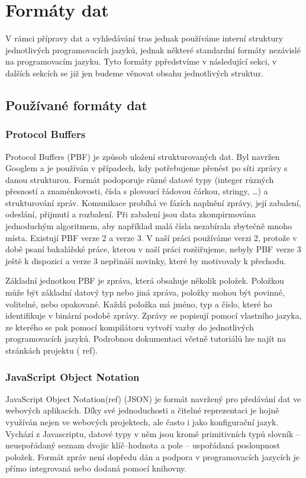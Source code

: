 \chapter{Formáty dat}
V rámci přípravy dat a vyhledávání tras jednak používáme interní struktury
jednotlivých programovacích jazyků, jednak některé standardní formáty nezávislé
na programovacím jazyku. Tyto formáty ppředstvíme v následující sekci, v dalších
sekcích se již jen budeme věnovat obsahu jednotlivých struktur.
\section{Používané formáty dat}
\subsection{Protocol Buffers}
Protocol Buffers (PBF) je způsob uložení strukturovaných dat. Byl navržen
Googlem a je používán v případech, kdy potřebujeme přenést po síti zprávy s
danou strukturou. Formát podoporuje různé datové typy (integer různých přesností
a znaménkovosti, čísla s plovoucí řádovou čárkou, stringy, \dots) a
strukturování zpráv. Komunikace probíhá ve fázích naplnění zprávy, její
zabalení, odeslání, přijmutí a rozbalení. Při zabalení jsou data zkompirmována
jednoduchým algoritmem, aby například malá čísla nezabírala zbytečně mnoho
místa. Existují PBF verze 2 a verze 3. V naší práci používáme verzi 2, protože v
době psaní bakalářské práce, kterou v naší práci rozšiřujeme, nebyly PBF verze 3
ještě k dispozici a verze 3 nepřináší novinky, které by motivovaly k přechodu.

Základní jednotkou PBF je zpráva, která obsahuje několik položek. Položkou může
být základní datový typ nebo jiná zpráva, položky mohou být povinné, volitelné,
nebo opakované. Každá položka má jméno, typ a číslo, které ho identifikuje v
binární podobě zprávy. Zprávy se popisují pomocí vlastního jazyka, ze kterého se
pak pomocí kompilátoru vytvoří vazby do jednotlivých programovacích jazyků. 
Podrobnou dokumentaci včetně tutoriálů lze najít na stránkách projektu (\TODO
ref).

\subsection{JavaScript Object Notation}
JavaScript Object Notation(\TODO ref) (JSON) je formát navržený pro předávání dat ve
webových aplikacích. Díky své jednoduchosti a čitelné reprezentaci je hojně
využíván nejen ve webových projektech, ale často i jako konfigurační jazyk.
Vychází z Javascriptu, datové typy v něm jsou kromě primitivních typů slovník --
neuspořádaný seznam dvojic klíč--hodnota a pole -- uspořádaná posloupnost
položek. Formát zpráv není dopředu dán a podpora v programovacích jazycích je
přímo integrovaná nebo dodaná pomocí knihovny. 

